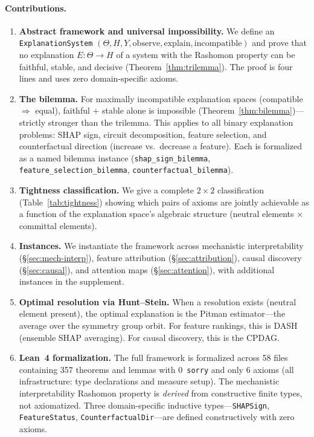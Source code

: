 \documentclass{article}
\begin{document}
\paragraph{Contributions.}
\begin{enumerate}[leftmargin=*,label=(\arabic*)]
\item \textbf{Abstract framework and universal impossibility.}
  We define an \texttt{ExplanationSystem} $(\Theta, H, Y, \mathrm{observe},
  \mathrm{explain}, \mathrm{incompatible})$ and prove that no explanation
  $E : \Theta \to H$ of a system with the Rashomon property can be
  faithful, stable, and decisive (Theorem~\ref{thm:trilemma}).
  The proof is four lines and uses zero domain-specific axioms.

\item \textbf{The bilemma.}
  For maximally incompatible explanation spaces (compatible $\Rightarrow$
  equal), faithful + stable alone is impossible
  (Theorem~\ref{thm:bilemma})---strictly stronger than the trilemma.
  This applies to all binary explanation problems: SHAP sign, circuit
  decomposition, feature selection, and counterfactual direction
  (increase vs.\ decrease a feature).
  Each is formalized as a named bilemma instance
  (\texttt{shap\_sign\_bilemma}, \texttt{feature\_selection\_bilemma},
  \texttt{counterfactual\_bilemma}).

\item \textbf{Tightness classification.}
  We give a complete $2 \times 2$ classification
  (Table~\ref{tab:tightness}) showing which pairs of axioms are jointly
  achievable as a function of the explanation space's algebraic structure
  (neutral elements $\times$ committal elements).

\item \textbf{Instances.}
  We instantiate the framework across mechanistic interpretability
  (\S\ref{sec:mech-interp}), feature attribution (\S\ref{sec:attribution}),
  causal discovery (\S\ref{sec:causal}), and attention maps
  (\S\ref{sec:attention}), with additional instances in the supplement.

\item \textbf{Optimal resolution via Hunt--Stein.}
  When a resolution exists (neutral element present), the optimal
  explanation is the Pitman estimator---the average over the symmetry group
  orbit. For feature rankings, this is DASH (ensemble SHAP averaging).
  For causal discovery, this is the CPDAG.

\item \textbf{Lean~4 formalization.}
  The full framework is formalized across 58 files containing 357
  theorems and lemmas with 0~\texttt{sorry} and only 6 axioms
  (all infrastructure: type declarations and measure setup).
  The mechanistic interpretability Rashomon property is \emph{derived}
  from constructive finite types, not axiomatized.
  Three domain-specific inductive types---\texttt{SHAPSign},
  \texttt{FeatureStatus}, \texttt{CounterfactualDir}---are
  defined constructively with zero axioms.
\end{enumerate}
\end{document}
